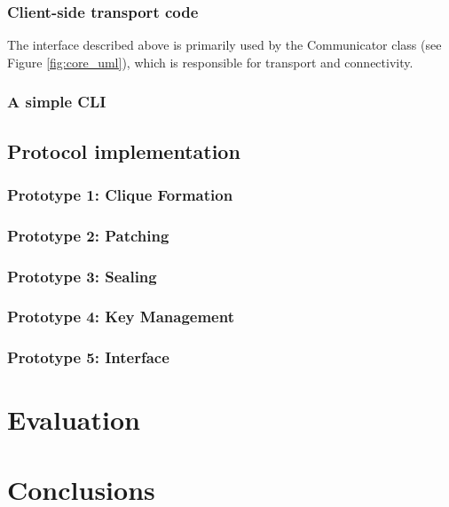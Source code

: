 \documentclass[a4paper, 12pt]{report}
\begin{document}

\subsection{Client-side transport code}
The interface described above is primarily used by the Communicator class (see Figure \ref{fig:core_uml}), which is responsible for transport and connectivity.


\subsection{A simple CLI}


\section{Protocol implementation}
\subsection{Prototype 1: Clique Formation}

\subsection{Prototype 2: Patching}


\subsection{Prototype 3: Sealing}


\subsection{Prototype 4: Key Management}


\subsection{Prototype 5: Interface}


\chapter{Evaluation}


\chapter{Conclusions}
\end{document}
